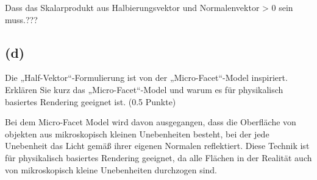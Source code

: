\documentclass[12pt]{scrreprt}
\begin{document}
Dass das Skalarprodukt aus Halbierungsvektor und Normalenvektor > 0 sein muss.???
\subsection*{(d)}
Die „Half-Vektor“-Formulierung ist von der „Micro-Facet“-Model inspiriert. Erklären Sie kurz
das „Micro-Facet“-Model und warum es für physikalisch basiertes Rendering geeignet ist. (0.5
Punkte)

Bei dem Micro-Facet Model wird davon ausgegangen, dass die Oberfläche von objekten aus mikroskopisch kleinen Unebenheiten besteht, bei der jede Unebenheit das Licht gemäß ihrer eigenen Normalen reflektiert. Diese Technik ist für physikalisch basiertes Rendering geeignet, da alle Flächen in der Realität auch von mikroskopisch kleine Unebenheiten durchzogen sind.
\end{document}
